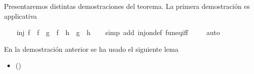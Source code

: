 \begin{isabellebody}
\begin{isamarkuptext}
  Presentaremos distintas demostraciones del teorema. La primera
  demostración es applicativa%
\end{isamarkuptext}\isamarkuptrue%
\isamarkupfalse%
\ \isanewline
\ \ {\isachardoublequoteopen}inj\ f\ {\isasymLongrightarrow}\ {\isacharparenleft}f\ {\isasymcirc}\ g\ {\isacharequal}\ f\ {\isasymcirc}\ h{\isacharparenright}\ {\isacharequal}\ {\isacharparenleft}g\ {\isacharequal}\ h{\isacharparenright}{\isachardoublequoteclose}\isanewline
%
\isadelimproof
\ \ %
\endisadelimproof
%
\isatagproof
{}\isamarkupfalse%
\ {\isacharparenleft}simp\ add{\isacharcolon}\ inj{\isacharunderscore}on{\isacharunderscore}def\ fun{\isacharunderscore}eq{\isacharunderscore}iff{\isacharparenright}\ \isanewline
\ \ \isamarkupfalse%
\ auto\isanewline
\ \ \isamarkupfalse%
%
\endisatagproof
{\isafoldproof}%
%
\isadelimproof
%
\endisadelimproof
%
\begin{isamarkuptext}%
En la demostración anterior se ha usado el siguiente lema
  \begin{itemize}
    \item[]  
      \hfill ()
  \end{itemize} 


\end{isamarkuptext}
\end{isabellebody}
